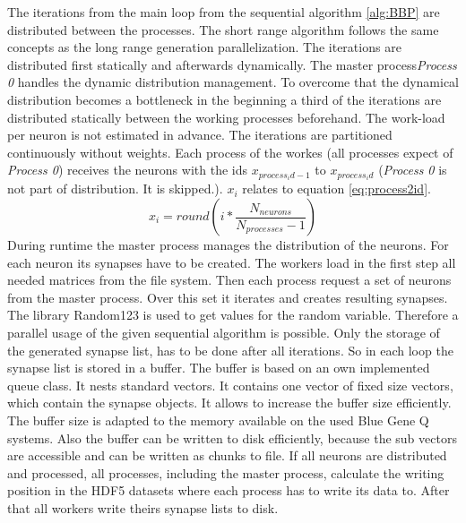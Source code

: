 The iterations from the main loop from the sequential algorithm \ref{alg:BBP} are distributed between the processes.
The short range algorithm follows the same concepts as the long range generation parallelization.
The iterations are distributed first statically and afterwards dynamically.
The master process\emph{Process 0} handles the dynamic distribution management.
To overcome that the dynamical distribution becomes a bottleneck in the beginning a third of the iterations are distributed
statically between the working processes beforehand.
The work-load per neuron is not estimated in advance.
The iterations are partitioned continuously without weights.
Each process of the workes (all processes expect of \emph{Process 0}) receives the neurons with the ids $x_{process_id-1}$
to $x_{process_id}$ (\emph{Process 0} is not part of distribution. It is skipped.).
$x_i$ relates to equation \ref{eq:process2id}.
\begin{equation}
	x_i = round(i * \frac{N_{neurons}}{N_{processes}-1})
	\label{eq:process2id}
\end{equation}
During runtime the master process manages the distribution of the neurons. For each neuron 
its synapses have to be created. The workers load in the first step all needed matrices from the file system.
Then each process request a set of neurons from the master process. Over this set it iterates and creates resulting
synapses. The library Random123 is used to get values for the random variable. Therefore a parallel usage of 
the given sequential algorithm is possible. Only the storage of the generated synapse list, has to be done 
after all iterations. So in each loop the synapse list is stored in a buffer.
The buffer is based on an own implemented queue class. It nests standard vectors.
It contains one vector of fixed size vectors, which contain the synapse objects.
It allows to increase the buffer size efficiently. The buffer size is adapted to 
the memory available on the used Blue Gene Q systems.
Also the buffer can be written to disk efficiently, because the sub vectors are
accessible and can be written as chunks to file.
If all neurons are distributed and processed, all processes, including the master process, calculate the writing position
in the HDF5 datasets where each process has to write its data to. After that all workers write theirs synapse lists to
disk.




